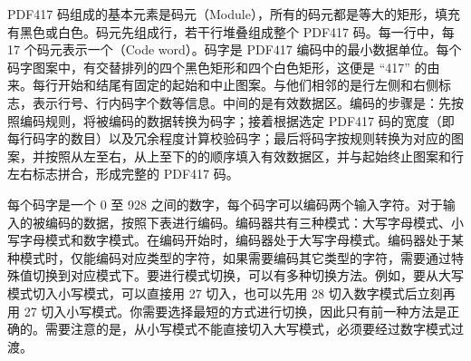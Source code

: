 PDF417 码组成的基本元素是码元（Module），所有的码元都是等大的矩形，填充有黑色或白色。码元先组成行，若干行堆叠组成整个 PDF417 码。每一行中，每 17 个码元表示一个{}（Code word）。码字是 PDF417 编码中的最小数据单位。每个码字图案中，有交替排列的四个黑色矩形和四个白色矩形，这便是 “417” 的由来。每行开始和结尾有固定的起始和中止图案。与他们相邻的是行左侧和右侧标志，表示行号、行内码字个数等信息。中间的是有效数据区。编码的步骤是：先按照编码规则，将被编码的数据转换为码字；接着根据选定 PDF417 码的宽度（即每行码字的数目）以及冗余程度计算校验码字；最后将码字按规则转换为对应的图案，并按照从左至右，从上至下的的顺序填入有效数据区，并与起始终止图案和行左右标志拼合，形成完整的 PDF417 码。

每个码字是一个 0 至 928 之间的数字，每个码字可以编码两个输入字符。对于输入的被编码的数据，按照下表进行编码。编码器共有三种模式：大写字母模式、小写字母模式和数字模式。在编码开始时，编码器处于大写字母模式。编码器处于某种模式时，仅能编码对应类型的字符，如果需要编码其它类型的字符，需要通过特殊值切换到对应模式下。要进行模式切换，可以有多种切换方法。例如，要从大写模式切入小写模式，可以直接用 27 切入，也可以先用 28 切入数字模式后立刻再用 27 切入小写模式。你需要选择最短的方式进行切换，因此只有前一种方法是正确的。需要注意的是，从小写模式不能直接切入大写模式，必须要经过数字模式过渡。

